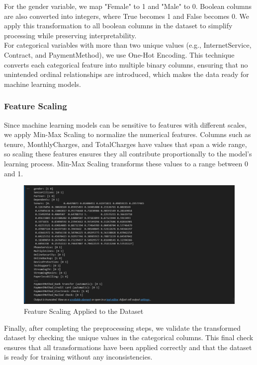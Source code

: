 For the gender variable, we map "Female" to 1 and "Male" to 0. Boolean columns are also converted into integers, where True becomes 1 and False becomes 0. We apply this transformation to all boolean columns in the dataset to simplify processing while preserving interpretability.\\

For categorical variables with more than two unique values (e.g., InternetService, Contract, and PaymentMethod), we use One-Hot Encoding. This technique converts each categorical feature into multiple binary columns, ensuring that no unintended ordinal relationships are introduced, which makes the data ready for machine learning models.

\subsubsection{Feature Scaling}
Since machine learning models can be sensitive to features with different scales, we apply Min-Max Scaling to normalize the numerical features. Columns such as tenure, MonthlyCharges, and TotalCharges have values that span a wide range, so scaling these features ensures they all contribute proportionally to the model’s learning process. Min-Max Scaling transforms these values to a range between 0 and 1.\\

\begin{figure}[hbt!]
    \centering
    \includegraphics[width=1\linewidth]{Images/2.4.4.a.jpg}
    \caption{Feature Scaling Applied to the Dataset }
    \label{fig:enter-label}
\end{figure}

Finally, after completing the preprocessing steps, we validate the transformed dataset by checking the unique values in the categorical columns. This final check ensures that all transformations have been applied correctly and that the dataset is ready for training without any inconsistencies.

